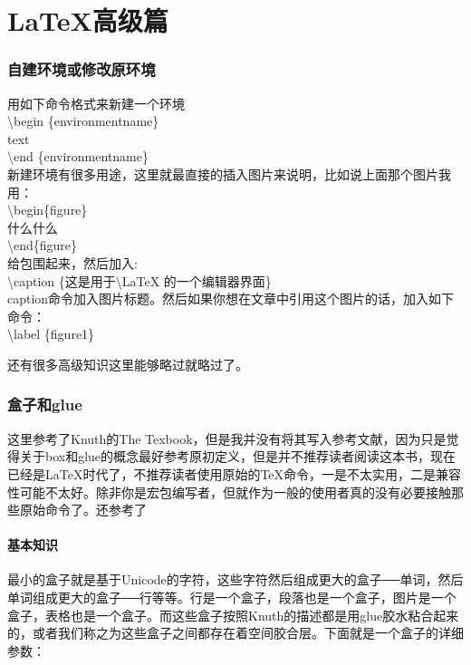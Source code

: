 \part{\LaTeX 高级篇}
\section{自建环境或修改原环境}
\label{sec:自建环境}

用如下命令格式来新建一个环境\\
\textbackslash begin \{environmentname\}\\
text\\
\textbackslash end \{environmentname\}\\
新建环境有很多用途，这里就最直接的插入图片来说明，比如说上面那个图片我用：\\
\textbackslash begin\{figure\}\\
什么什么\\
\textbackslash end\{figure\}\\
给包围起来，然后加入:\\
\textbackslash caption \{这是用于\textbackslash LaTeX 的一个编辑器界面\}\\
caption命令加入图片标题。然后如果你想在文章中引用这个图片的话，加入如下命令：\\
\textbackslash label \{figure1\}

还有很多高级知识这里能够略过就略过了。

\section{盒子和glue}
\label{sec:盒子和glue}
\begin{fancycolorbox}
这里参考了Knuth的The Texbook，但是我并没有将其写入参考文献，因为只是觉得关于box和glue的概念最好参考原初定义，但是并不推荐读者阅读这本书，现在已经是\LaTeX 时代了，不推荐读者使用原始的\TeX 命令，一是不太实用，二是兼容性可能不太好。除非你是宏包编写者，但就作为一般的使用者真的没有必要接触那些原始命令了。还参考了\cite{boxes}
\end{fancycolorbox}
\subsection{基本知识}
最小的盒子就是基于Unicode的字符，这些字符然后组成更大的盒子──单词，然后单词组成更大的盒子──行等等。行是一个盒子，段落也是一个盒子，图片是一个盒子，表格也是一个盒子。而这些盒子按照Knuth的描述都是用glue胶水粘合起来的，或者我们称之为这些盒子之间都存在着空间胶合层。下面就是一个盒子的详细参数：

